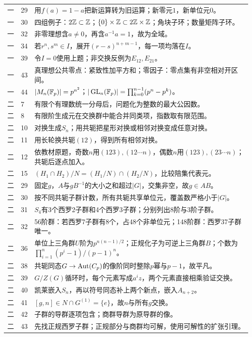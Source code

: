 \begin{longtable}{p{1.1cm}p{1.0cm}p{12.1cm}}
一&29&用$f(a)=1-a$把新运算转为旧运算；新零元$1$，新单位元$0$。\\
一&30&四组例子：$2\mathbb Z\subset\mathbb Z$；$\{0\}\times\mathbb Z\subset2\mathbb Z\times\mathbb Z$；角块子环；数量矩阵子环。\\
一&32&非零理想含$a\ne0$，再含$a^{-1}a=1$，故为全域。\\
一&34&若$r^n,s^m\in I$，展开$(r-s)^{n+m-1}$，每一项均落在$I$。\\
一&39&令$I=0$使用上题；非交换反例为$E_{12},E_{21}$。\\
一&43&真理想公共零点：紧致性加平方和；零因子：零点集有非空相对开区间。\\
一&44&$|M_n(\mathbb F_p)|=p^{n^2}$；$|\operatorname{GL}_n(\mathbb F_p)|=\prod_{k=0}^{n-1}(p^n-p^k)$。\\\midrule
二&7&有限个有理数统一分母后，问题化为整数的最大公因数。\\
二&8&有限阶生成元在交换群中能合并同类项，指数取有限范围。\\
二&10&对换生成$S_n$；用共轭把星形对换或相邻对换变成任意对换。\\
二&11&用长轮换共轭$(12)$，得到所有相邻对换。\\
二&12&依教材原题，奇数$n$用$(123),(12\cdots n)$，偶数$n$用$(123),(23\cdots n)$；共轭后逐点加入。\\
二&15&$(H_1\cap H_2)/N=(H_1/N)\cap(H_2/N)$，比较陪集代表元。\\
二&29&固定$g$，$A$与$gB^{-1}$的大小之和超过$|G|$，交集非空，故$g\in AB$。\\
二&30&按不同共轭子群计数，所有共轭共享单位元，覆盖数严格小于$|G|$。\\
二&31&$S_4$有3个西罗2子群和4个西罗3子群；分别列出8阶与3阶子群。\\
二&32&56阶群：若西罗7子群有8个，占48个非单位元；148阶群：西罗37子群唯一。\\
二&36&单位上三角群$U$阶为$p^{n(n-1)/2}$；正规化子为可逆上三角群$B$；个数为$\prod_{i=1}^n(p^i-1)/(p-1)^n$。\\
二&38&共轭同态$G\to\operatorname{Aut}(C_p)$的像阶同时整除$p$幂与$p-1$，故平凡。\\
二&39&$G/Z(G)$循环时，每个元素写成$a^iz$，两个元素直接相乘验证交换。\\
二&40&凯莱嵌入$S_n$，再以符号同态补上两个新点，嵌入$A_{n+2}$。\\
二&41&$[g,n]\in N\cap G^{(1)}=\{e\}$，故$n$与所有$g$交换。\\
二&42&子群的导群逐项包含；商群导群为原导群的像。\\
二&43&先找正规西罗子群；正规部分与商群均可解，使用可解性的扩张引理。\\

\end{longtable}
